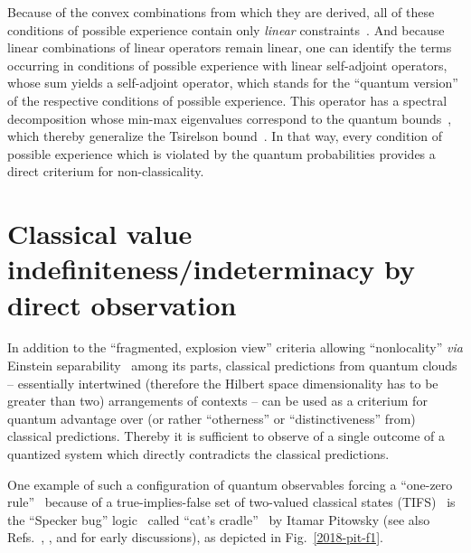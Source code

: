 \documentclass[%
  twocolumn,
 showpacs,
 showkeys,
 preprintnumbers,
 amsmath,amssymb,
 aps,
  pra,
  longbibliography,
 ]{revtex4-1}
\begin{document}
Because of the convex combinations from which they are derived, all of these conditions of possible experience contain only
{\em linear}
constraints~\citep{Boole,Boole-62,Frechet1935,Hailperin-1965,Hailperin-86,Ursic1984,Ursic:1986:GFL:3023712.3023752,Ursic1988,Beltrametti-1991,Pykacz-1991,Pulmannova-1992,Beltrametti-1993,Beltrametti-1994,DvurLaen-1994,Beltrametti1995,Beltrametti-1995,Noce-1995,Laenger1995,DvurLaen-1995,DvurLaen-1995b,Beltrametti-1996,Pulmannova-2002}.
And because linear combinations of linear operators remain linear,
one can identify the terms occurring in conditions of possible experience with linear self-adjoint operators,
whose sum yields a self-adjoint operator, which stands for the ``quantum version'' of the respective conditions of possible experience.
This operator has a spectral decomposition whose min-max eigenvalues correspond to the quantum bounds~\citep{filipp-svo-04-qpoly,filipp-svo-04-qpoly-prl},
which thereby generalize the  Tsirelson bound~\citep{cirelson:80}.
In that way, every condition of possible experience which is violated by the quantum probabilities provides a direct criterium for non-classicality.





\section{Classical value indefiniteness/indeterminacy by direct observation}



In addition to the ``fragmented, explosion view''
criteria allowing ``nonlocality'' {\it via} Einstein separability~\citep{wjswz-98} among its parts,
classical predictions from quantum clouds -- essentially intertwined (therefore the Hilbert space dimensionality has to be greater than two)
arrangements of contexts -- can be used as a criterium for quantum advantage over (or rather ``otherness''
or ``distinctiveness'' from) classical predictions.
Thereby it is sufficient to observe of a single outcome of a quantized system which directly contradicts the classical predictions.

One example of such a configuration of quantum observables forcing a ``one-zero rule''~\citep{svozil-2006-omni} because of a
true-implies-false set of two-valued classical states (TIFS)~\citep{2018-minimalYIYS}
is the ``Specker bug'' logic~\cite[Fig.~1, p.~182]{kochen2}
called  ``cat's cradle''~\citep{Pitowsky2003395,pitowsky-06} by Itamar Pitowsky
(see also Refs.~\cite[Fig.~B.l. p.~64]{Belinfante-73}, \cite[p.~588-589]{stairs83},
\cite[Sects.~IV, Fig.~2]{clifton-93}  and \cite[p.~39, Fig.~2.4.6]{pulmannova-91} for early discussions), as
depicted in Fig.~\ref{2018-pit-f1}.
\end{document}
